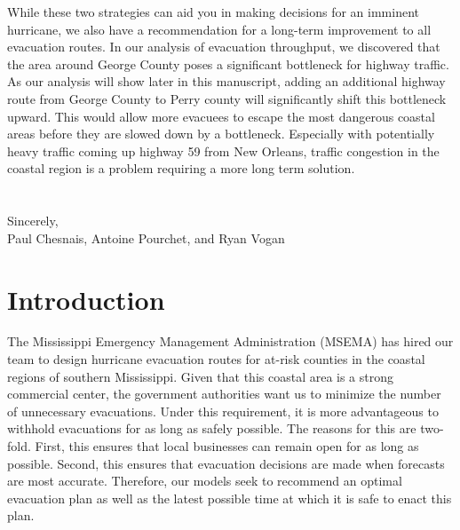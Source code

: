 \documentclass[titlepage]{article}
\begin{document}
While these two strategies can aid you in making decisions for an imminent hurricane, we also have a recommendation for a long-term improvement to all evacuation routes. In our analysis of evacuation throughput, we discovered that the area around George County poses a significant bottleneck for highway traffic. As our analysis will show later in this manuscript, adding an additional highway route from George County to Perry county will significantly shift this bottleneck upward. This would allow more evacuees to escape the most dangerous coastal areas before they are slowed down by a bottleneck. Especially with potentially heavy traffic coming up highway 59 from New Orleans, traffic congestion in the coastal region is a problem requiring a more long term solution.\\
\\
\\
Sincerely,\\
Paul Chesnais, Antoine Pourchet, and Ryan Vogan

\newpage
\section{Introduction}
\label{sec:introduction}
  The Mississippi Emergency Management Administration (MSEMA) has hired our team to design hurricane evacuation routes for at-risk counties in the coastal regions of southern Mississippi. Given that this coastal area is a strong commercial center, the government authorities want us to minimize the number of unnecessary evacuations. Under this requirement, it is more advantageous to withhold evacuations for as long as safely possible. The reasons for this are two-fold. First, this ensures that local businesses can remain open for as long as possible. Second, this ensures that evacuation decisions are made when forecasts are most accurate. Therefore, our models seek to recommend an optimal evacuation plan as well as the latest possible time at which it is safe to enact this plan.
\end{document}
